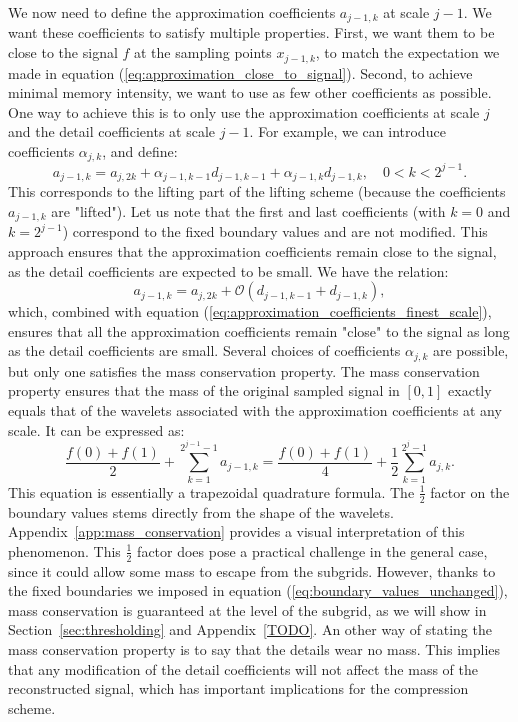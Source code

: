 We now need to define the approximation coefficients \( a_{j-1,k} \) at scale \( j-1 \).
We want these coefficients to satisfy multiple properties.
First, we want them to be close to the signal \( f \) at the sampling points \( x_{j-1,k} \), to match the expectation we made in equation (\ref{eq:approximation_close_to_signal}).
Second, to achieve minimal memory intensity, we want to use as few other coefficients as possible.
One way to achieve this is to only use the approximation coefficients at scale \( j \) and the detail coefficients at scale \( j-1 \).
For example, we can introduce coefficients \( \alpha_{j,k} \), and define:
\begin{equation}
a_{j-1,k} = a_{j,2k} + \alpha_{j-1,k-1} d_{j-1,k-1} + \alpha_{j-1,k} d_{j-1,k}, \quad 0 < k < 2^{j-1}. \label{eq:compute_samples_general}
\end{equation}
This corresponds to the lifting part of the lifting scheme (because the coefficients $a_{j-1,k}$ are "lifted").
Let us note that the first and last coefficients (with $k=0$ and $k=2^{j-1}$) correspond to the fixed boundary values and are not modified.
This approach ensures that the approximation coefficients remain close to the signal, as the detail coefficients are expected to be small.
We have the relation:
\begin{equation}
a_{j-1,k} = a_{j,2k} + \mathcal{O}(d_{j-1,k-1}+d_{j-1,k}),
\end{equation}
which, combined with equation (\ref{eq:approximation_coefficients_finest_scale}), ensures that all the approximation coefficients remain "close" to the signal as long as the detail coefficients are small.
Several choices of coefficients \( \alpha_{j,k} \) are possible, but only one satisfies the mass conservation property.
The mass conservation property ensures that the mass of the original sampled signal in $[0,1]$ exactly equals that of the wavelets associated with the approximation coefficients at any scale.
It can be expressed as:
\begin{equation}
\frac{f(0)+f(1)}{2} + \sum_{k=1}^{2^{j-1}-1} a_{j-1,k} = \frac{f(0)+f(1)}{4} + \frac{1}{2} \sum_{k=1}^{2^{j}-1} a_{j,k}. \label{eq:conservation}
\end{equation}
This equation is essentially a trapezoidal quadrature formula.
The $\frac{1}{2}$ factor on the boundary values stems directly from the shape of the wavelets.
Appendix~\ref{app:mass_conservation} provides a visual interpretation of this phenomenon.
This $\frac{1}{2}$ factor does pose a practical challenge in the general case, since it could allow some mass to escape from the subgrids.
However, thanks to the fixed boundaries we imposed in equation (\ref{eq:boundary_values_unchanged}), mass conservation is guaranteed at the level of the subgrid, as we will show in Section~\ref{sec:thresholding} and Appendix~\ref{TODO}.
An other way of stating the mass conservation property is to say that the details wear no mass.
This implies that any modification of the detail coefficients will not affect the mass of the reconstructed signal, which has important implications for the compression scheme.

